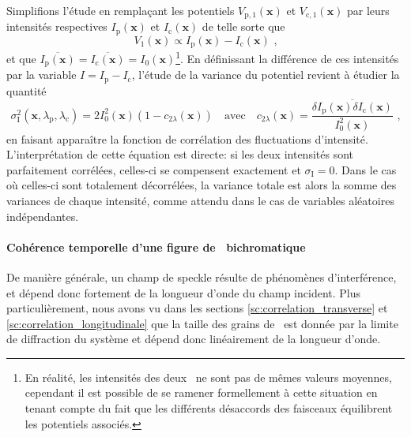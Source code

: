 Simplifions l'étude en remplaçant les potentiels $V_{\mathrm{p,1}}(\mathbf{x})$ et $V_{\mathrm{c,1}}(\mathbf{x})$ par leurs intensités respectives $I_{\mathrm{p}}(\mathbf{x})$ et $I_{\mathrm{c}}(\mathbf{x})$ de telle sorte que
\begin{equation}
V_1(\mathbf{x})\propto I_{\mathrm{p}}(\mathbf{x}) - I_{\mathrm{c}}(\mathbf{x}) \text{ ,}
\end{equation}
et que $\overline{I_{\mathrm{p}}(\mathbf{x})}=\overline{I_{\mathrm{c}}(\mathbf{x})}=I_0(\mathbf{x})$\footnote{En réalité, les intensités des deux \speckles\ ne sont pas de mêmes valeurs moyennes, cependant il est possible de se ramener formellement à cette situation en tenant compte du fait que les différents désaccords des faisceaux équilibrent les potentiels associés.}. En définissant la différence de ces intensités par la variable $I=I_{\mathrm{p}}-I_{\mathrm{c}}$, l'étude de la variance du potentiel revient à étudier la quantité
\begin{equation}
\sigma_{\mathrm{I}}^2(\mathbf{x},\lambda_{\mathrm{p}},\lambda_{\mathrm{c}})=2 I_0^2(\mathbf{x}) \left(1- c_{\mathrm{2}\lambda}(\mathbf{x}) \right) \quad \text{avec} \quad c_{\mathrm{2}\lambda}(\mathbf{x})=\frac{\overline{\delta I_{\mathrm{p}}(\mathbf{x})\delta I_{\mathrm{c}}(\mathbf{x})}}{I_0^2(\mathbf{x})} \text{ ,}
\label{eq:variance_intensite_bichromatique}
\end{equation}
en faisant apparaître la fonction de corrélation des fluctuations d'intensité. L'interprétation de cette équation est directe: si les deux intensités sont parfaitement corrélées, celles-ci se compensent exactement et $\sigma_{\mathrm{I}}=0$. Dans le cas où celles-ci sont totalement décorrélées, la variance totale est alors la somme des variances de chaque intensité, comme attendu dans le cas de variables aléatoires indépendantes.











\paragraph*{Cohérence temporelle d'une figure de \speckle\ bichromatique}
De manière générale, un champ de speckle résulte de phénomènes d'interférence, et dépend donc fortement de la longueur d'onde du champ incident. Plus particulièrement, nous avons vu dans les sections \ref{sc:correlation_transverse} et \ref{sc:correlation_longitudinale} que la taille des grains de \speckle\ est donnée par la limite de diffraction du système et dépend donc linéairement de la longueur d'onde. 

